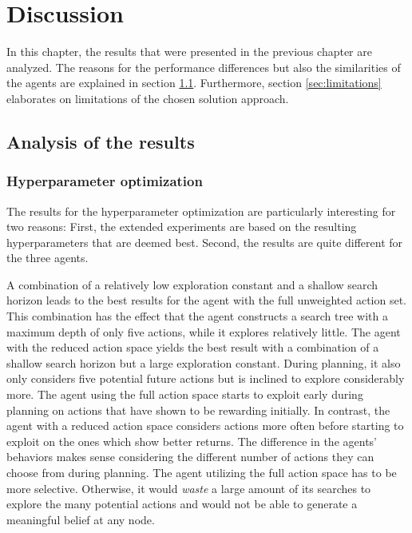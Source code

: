 \chapter{Discussion}
\label{ch:discussion}

In this chapter, the results that were presented in the previous chapter are analyzed. The reasons for the performance differences but also the similarities of the agents are explained in section \ref{sec:discussion_analysis}. Furthermore, section \ref{sec:limitations} elaborates on limitations of the chosen solution approach.

\section{Analysis of the results}
\label{sec:discussion_analysis}

\subsection{Hyperparameter optimization}

The results for the hyperparameter optimization are particularly interesting for two reasons: First, the extended experiments are based on the resulting hyperparameters that are deemed best. Second, the results are quite different for the three agents. 

A combination of a relatively low exploration constant and a shallow search horizon leads to the best results for the agent with the full unweighted action set. This combination has the effect that the agent constructs a search tree with a maximum depth of only five actions, while it explores relatively little. The agent with the reduced action space yields the best result with a combination of a shallow search horizon but a large exploration constant. During planning, it also only considers five potential future actions but is inclined to explore considerably more. The agent using the full action space starts to exploit early during planning on actions that have shown to be rewarding initially. In contrast, the agent with a reduced action space considers actions more often before starting to exploit on the ones which show better returns. The difference in the agents' behaviors makes sense considering the different number of actions they can choose from during planning. The agent utilizing the full action space has to be more selective. Otherwise, it would \emph{waste} a large amount of its searches to explore the many potential actions and would not be able to generate a meaningful belief at any node.


